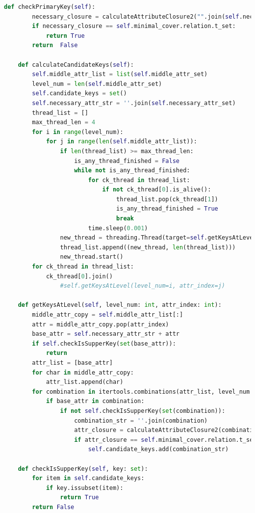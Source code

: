 \documentclass[a4paper,12pt]{article}
\begin{document}
{\begin{lstlisting}[language=python, caption={Algoritmo que calcula las llaves candidatas.\\\hspace{\textwidth}}, captionpos=t]
    def checkPrimaryKey(self):
        necessary_closure = calculateAttributeClosure2("".join(self.necessary_attr_set), self.minimal_cover.irreducible_rel.l_set)
        if necessary_closure == self.minimal_cover.relation.t_set:
            return True
        return  False

    def calculateCandidateKeys(self):
        self.middle_attr_list = list(self.middle_attr_set)
        level_num = len(self.middle_attr_set)
        self.candidate_keys = set()
        self.necessary_attr_str = ''.join(self.necessary_attr_set)
        thread_list = []
        max_thread_len = 4
        for i in range(level_num):
            for j in range(len(self.middle_attr_list)):
                if len(thread_list) >= max_thread_len:
                    is_any_thread_finished = False
                    while not is_any_thread_finished:
                        for ck_thread in thread_list:
                            if not ck_thread[0].is_alive():
                                thread_list.pop(ck_thread[1])
                                is_any_thread_finished = True
                                break
                        time.sleep(0.001)
                new_thread = threading.Thread(target=self.getKeysAtLevel, kwargs={"level_num": i, "attr_index": j})
                thread_list.append((new_thread, len(thread_list)))
                new_thread.start()
        for ck_thread in thread_list:
            ck_thread[0].join()
                #self.getKeysAtLevel(level_num=i, attr_index=j)

    def getKeysAtLevel(self, level_num: int, attr_index: int):
        middle_attr_copy = self.middle_attr_list[:]
        attr = middle_attr_copy.pop(attr_index)
        base_attr = self.necessary_attr_str + attr
        if self.checkIsSupperKey(set(base_attr)):
            return
        attr_list = [base_attr]
        for char in middle_attr_copy:
            attr_list.append(char)
        for combination in itertools.combinations(attr_list, level_num + 1):
            if base_attr in combination:
                if not self.checkIsSupperKey(set(combination)):
                    combination_str = ''.join(combination)
                    attr_closure = calculateAttributeClosure2(combination_str, self.minimal_cover.irreducible_rel.l_set)
                    if attr_closure == self.minimal_cover.relation.t_set:
                        self.candidate_keys.add(combination_str)

    def checkIsSupperKey(self, key: set):
        for item in self.candidate_keys:
            if key.issubset(item):
                return True
        return False


\end{lstlisting}}
\end{document}

